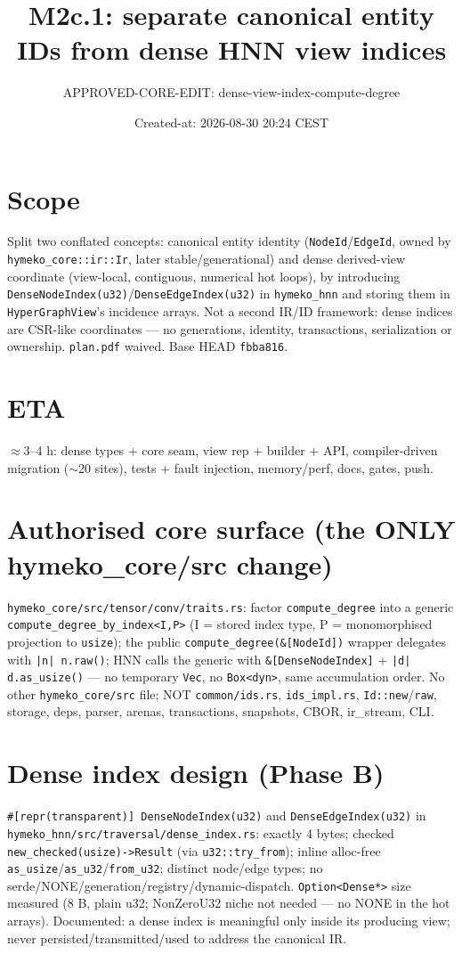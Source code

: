 \documentclass[11pt]{article}
\title{M2c.1: separate canonical entity IDs from dense HNN view indices}
\author{APPROVED-CORE-EDIT: dense-view-index-compute-degree}
\date{Created-at: 2026-08-30 20:24 CEST}
\begin{document}
\maketitle
\section*{Scope}
Split two conflated concepts: canonical entity identity (\texttt{NodeId}/\texttt{EdgeId},
owned by \texttt{hymeko\_core::ir::Ir}, later stable/generational) and dense
derived-view coordinate (view-local, contiguous, numerical hot loops), by
introducing \texttt{DenseNodeIndex(u32)}/\texttt{DenseEdgeIndex(u32)} in
\texttt{hymeko\_hnn} and storing them in \texttt{HyperGraphView}'s incidence arrays.
Not a second IR/ID framework: dense indices are CSR-like coordinates --- no
generations, identity, transactions, serialization or ownership. \texttt{plan.pdf}
waived. Base HEAD \texttt{fbba816}.
\section{ETA} $\approx$3--4 h: dense types + core seam, view rep + builder + API,
compiler-driven migration ($\sim$20 sites), tests + fault injection, memory/perf,
docs, gates, push.
\section{Authorised core surface (the ONLY hymeko\_core/src change)}
\texttt{hymeko\_core/src/tensor/conv/traits.rs}: factor \texttt{compute\_degree}
into a generic \texttt{compute\_degree\_by\_index<I,P>} (I = stored index type, P
= monomorphised projection to \texttt{usize}); the public
\texttt{compute\_degree(\&[NodeId])} wrapper delegates with \texttt{|n| n.raw()};
HNN calls the generic with \texttt{\&[DenseNodeIndex]} + \texttt{|d| d.as\_usize()}
--- no temporary \texttt{Vec}, no \texttt{Box<dyn>}, same accumulation order. No
other \texttt{hymeko\_core/src} file; NOT \texttt{common/ids.rs},
\texttt{ids\_impl.rs}, \texttt{Id::new}/\texttt{raw}, storage, deps, parser, arenas,
transactions, snapshots, CBOR, ir\_stream, CLI.
\section{Dense index design (Phase B)}
\texttt{\#[repr(transparent)] DenseNodeIndex(u32)} and \texttt{DenseEdgeIndex(u32)}
in \texttt{hymeko\_hnn/src/traversal/dense\_index.rs}: exactly 4 bytes; checked
\texttt{new\_checked(usize)->Result} (via \texttt{u32::try\_from}); inline
alloc-free \texttt{as\_usize}/\texttt{as\_u32}/\texttt{from\_u32}; distinct node/edge
types; no serde/NONE/generation/registry/dynamic-dispatch. \texttt{Option<Dense*>}
size measured (8 B, plain u32; NonZeroU32 niche not needed --- no NONE in the hot
arrays). Documented: a dense index is meaningful only inside its producing view;
never persisted/transmitted/used to address the canonical IR.
\end{document}
